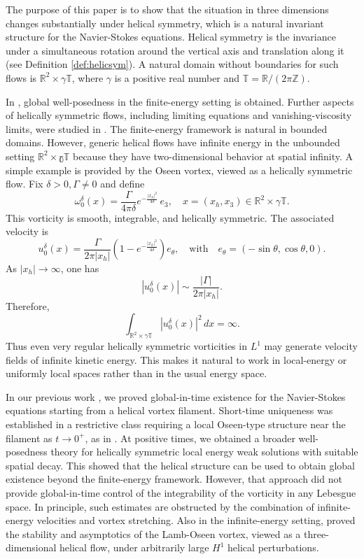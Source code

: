 \documentclass[11pt,a4paper]{article}
\newcommand{\Z}{\mathbb{Z}}
\newcommand{\R}{\mathbb{R}}
\newcommand{\T}{\mathbb{T}}
\begin{document}
The purpose of this paper is to show that the situation in three dimensions changes
substantially under helical symmetry, which is a natural invariant structure for the Navier-Stokes equations. Helical symmetry is the invariance
under a simultaneous rotation around the vertical axis and translation
along it (see Definition \ref{def:helicsym}). A
natural domain without boundaries for such flows is $\mathbb R^2\times \gamma\mathbb T$, where $\gamma$ is a positive real number and $\T=\R/(2\pi\Z)$.

In
\cite{MahalovTitiLeibovich90}, global well-posedness in the
finite-energy setting is obtained. Further aspects of helically symmetric flows,
including limiting equations and vanishing-viscosity limits, were studied in
\cite{lopesmazzucatoniunussenzveig2014,jiulopesniunussenzveig2018}.
The finite-energy framework is natural in bounded domains. However, generic helical flows have infinite energy in the
unbounded setting $\mathbb R^2\times\mathbb \gamma \T$ because they have
two-dimensional behavior at spatial infinity.
A simple example is provided by the Oseen vortex, viewed as a helically
symmetric flow. Fix $\delta>0, \Gamma\neq 0$ and define
$$
    \omega^\delta_0(x)
    =
    \frac{\Gamma}{4\pi\delta}
    e^{-\frac{|x_h|^2}{4\delta}}\,e_3,
    \quad
    x=(x_h,x_3)\in\mathbb R^2\times \gamma \mathbb T.
$$
This vorticity is smooth, integrable, and
helically symmetric. The associated velocity is
$$
    u^\delta_0(x)
    =
    \frac{\Gamma}{2\pi |x_h|}
    \left(
        1-e^{-\frac{|x_h|^2}{4\delta}}
    \right)e_\theta,\quad\mbox{with}\quad e_\theta=(-\sin\theta,\cos\theta,0).
$$
As $|x_h|\to\infty$, one has
$$
    |u^\delta_0(x)|\sim \frac{|\Gamma|}{2\pi |x_h|}.
$$
Therefore,
$$
    \int_{\mathbb R^2\times \gamma \mathbb T}|u^\delta_0(x)|^2\,dx
    =
    \infty.
$$
Thus even very regular helically symmetric vorticities in $L^1$ may
generate velocity fields of infinite kinetic energy. This makes it natural
to work in local-energy or uniformly local spaces rather than in the usual
energy space.

In our previous work \cite{GH-T2023}, we proved global-in-time
existence for the Navier-Stokes equations starting from a helical
vortex filament. Short-time uniqueness was established in a
restrictive class requiring a local Oseen-type structure near the
filament as $t\to0^+$, as in \cite{bedrossiangermainharropgriffiths23}. At positive times, we obtained a broader
well-posedness theory for helically symmetric local energy weak
solutions with suitable spatial decay.
This showed that the helical structure can be used to obtain global existence beyond the finite-energy framework.
However, that approach did not provide global-in-time control of the
integrability of the vorticity in any Lebesgue space. In principle,
such estimates are obstructed by the combination of infinite-energy
velocities and vortex stretching. Also in the infinite-energy setting, \cite{Vila2024} proved the stability and asymptotics of the Lamb-Oseen vortex, viewed as a three-dimensional helical flow, under arbitrarily large $H^1$
 helical perturbations.
\end{document}
